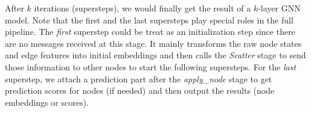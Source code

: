 \documentclass[conference]{IEEEtran}
\begin{document}

After $k$ iterations (supersteps), we would finally get the result of a $k$-layer GNN model.
Note that the first and the last supersteps play special roles in the full pipeline.
The \emph{first} superstep could be treat as an initialization step since there are no messages received at this stage.
It mainly transforms the raw node states and edge features into initial embeddings and then calls the \emph{Scatter} stage to send those information to other nodes to start the following supersteps.
For the \emph{last} superstep, we attach a prediction part after the \emph{apply\_node} stage to get prediction scores for nodes (if needed) and then output the results (node embeddings or scores).

\end{document}
